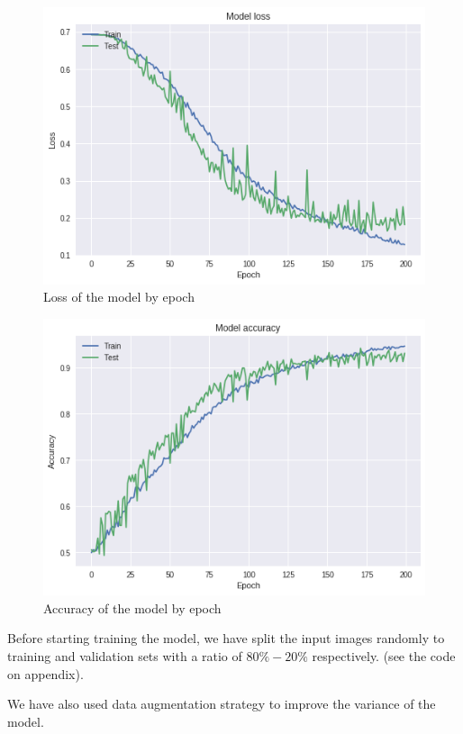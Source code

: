 \documentclass[a4paper]{article}
\begin{document}
\begin{figure}[h!]
	\centering
	\includegraphics[scale=.6]{VGGLoss_of.png}
	\caption{Loss of the model by epoch}
	\label{fig:vggloss}
\end{figure}

\begin{figure}[h!]
	\centering
	\includegraphics[scale=.6]{VGGAccu_of.png}
	\caption{Accuracy of the model by epoch}
	\label{fig:vggacc}
\end{figure}

Before starting training the model, we have split the input images randomly to training and validation sets with a ratio of $80\%-20\%$ respectively. (see the code on appendix).

We have also used data augmentation strategy to improve the variance of the model.
\end{document}
